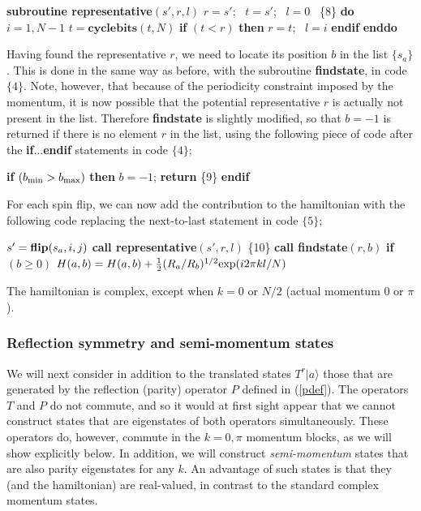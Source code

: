 \documentclass[draft,numberedheadings]{aipproc}
\newcommand{\half}{\hbox{$\frac{1}{2}$}}
\newcommand{\code}{\null\vskip-2mm\noindent}
\newcommand{\br}{\hfill\break}
\newcommand{\cia}{\null\hskip5mm}
\newcommand{\cib}{\null\hskip10mm}
\begin{document}
{\code
\cia    {\bf subroutine representative}$(s',r,l)$ \br
\cia    $r=s'$;~ $t=s'$;~ $l=0$~                                \hfill \{8\}\break
\cia    {\bf do} $i=1,N-1$ \br
\cib       $t=\mathbf{cyclebits}(t,N)$ \br 
\cib       {\bf if} $(t<r)$ {\bf then} $r=t$;~ $l=i$ {\bf endif} \br
\cia    {\bf enddo} 
\code}

\noindent
Having found the representative $r$, we need to locate its position $b$ in the list $\{s_a\}$. This is done in the same way as before, with the subroutine 
{\bf findstate}, in code $\{4\}$. Note, however, that because of the periodicity constraint imposed by the momentum, it is now possible that the potential 
representative $r$ is actually not present in the list. Therefore {\bf findstate} is slightly modified, so that $b=-1$ is returned if there is no element 
$r$ in the list, using the following piece of code after the {\bf if}...{\bf endif} statements in code $\{4\}$;

{\code
\cia    {\bf if} $(b_{\rm min}>b_{\rm max})$ {\bf then} \br 
\cib       $b=-1$; {\bf return}                                        \hfill \{9\}\break 
\cia    {\bf endif} 
\code}

\noindent
For each spin flip, we can now add the contribution to the hamiltonian with the following code replacing the next-to-last statement in code $\{5\}$;

{\code
\cia    $s'={\bf flip}(s_a,i,j)$ \br
\cia    {\bf call representative}$(s',r,l)$       \hfill \{10\}\break  
\cia    {\bf call findstate}$(r,b)$  \br      
\cia    {\bf if} $(b\ge 0)$ $H(a,b)=H(a,b)+\half (R_a/R_b)^{1/2}{\rm exp}(i2\pi kl/N)$  
\code}

\noindent
The hamiltonian is complex, except when $k=0$ or $N/2$ (actual momentum $0$ or $\pi$). 

\subsubsection{Reflection symmetry and semi-momentum states}
\label{reflection}

We will next consider in addition to the translated states $T^r |a\rangle$ those that are generated by the reflection (parity) operator $P$ defined in
(\ref{pdef}). The operators $T$ and $P$ do not commute, and so it would at first sight appear that we cannot construct states that are eigenstates of
both operators simultaneously. These operators do, however, commute in the $k=0,\pi$ momentum blocks, as we will show explicitly below. In addition, we will construct 
{\it semi-momentum} states that are also parity eigenstates for any $k$. An advantage of such states is that they (and the hamiltonian) are real-valued, 
in contrast to the standard complex momentum states.
\end{document}
